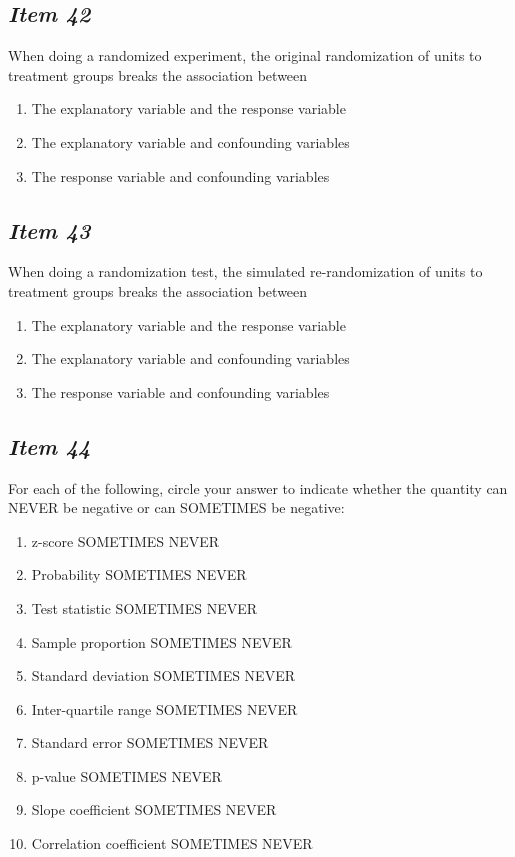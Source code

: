 \subsection{\textbf{\textit{Item 42}}}
When doing a randomized experiment, the original randomization of units to
treatment groups breaks the association between
\begin{enumerate} [leftmargin=2cm, itemsep=.2em]
\item The explanatory variable and the response variable
\item The explanatory variable and confounding variables
\item The response variable and confounding variables
\end{enumerate}

\subsection{\textbf{\textit{Item 43}}}
When doing a randomization test, the simulated re-randomization of units to
treatment groups breaks the association between
\begin{enumerate} [leftmargin=2cm, itemsep=.2em]
\item The explanatory variable and the response variable
\item The explanatory variable and confounding variables
\item The response variable and confounding variables
\end{enumerate}

\subsection{\textbf{\textit{Item 44}}}
For each of the following, circle your answer to indicate whether the quantity can NEVER be negative or can SOMETIMES be negative:
\begin{enumerate} [leftmargin=1cm, itemsep=.2em]
\item z-score			SOMETIMES		NEVER
\item Probability			SOMETIMES		NEVER
\item Test statistic		SOMETIMES		NEVER
\item Sample proportion		SOMETIMES		NEVER
\item Standard deviation		SOMETIMES		NEVER
\item Inter-quartile range	SOMETIMES		NEVER
\item Standard error		SOMETIMES		NEVER
\item p-value			SOMETIMES		NEVER
\item Slope coefficient		SOMETIMES		NEVER
\item Correlation coefficient	SOMETIMES		NEVER
\end{enumerate}

